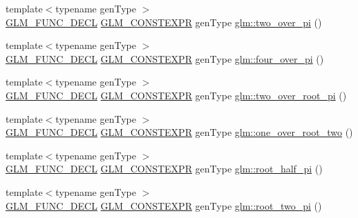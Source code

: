 \begin{DoxyCompactItemize}
\item 
{\footnotesize template$<$typename gen\+Type $>$ }\\\hyperlink{setup_8hpp_ab2d052de21a70539923e9bcbf6e83a51}{G\+L\+M\+\_\+\+F\+U\+N\+C\+\_\+\+D\+E\+CL} \hyperlink{setup_8hpp_a08b807947b47031d3a511f03f89645ad}{G\+L\+M\+\_\+\+C\+O\+N\+S\+T\+E\+X\+PR} gen\+Type \hyperlink{group__gtc__constants_ga74eadc8a211253079683219a3ea0462a}{glm\+::two\+\_\+over\+\_\+pi} ()
\item 
{\footnotesize template$<$typename gen\+Type $>$ }\\\hyperlink{setup_8hpp_ab2d052de21a70539923e9bcbf6e83a51}{G\+L\+M\+\_\+\+F\+U\+N\+C\+\_\+\+D\+E\+CL} \hyperlink{setup_8hpp_a08b807947b47031d3a511f03f89645ad}{G\+L\+M\+\_\+\+C\+O\+N\+S\+T\+E\+X\+PR} gen\+Type \hyperlink{group__gtc__constants_ga753950e5140e4ea6a88e4a18ba61dc09}{glm\+::four\+\_\+over\+\_\+pi} ()
\item 
{\footnotesize template$<$typename gen\+Type $>$ }\\\hyperlink{setup_8hpp_ab2d052de21a70539923e9bcbf6e83a51}{G\+L\+M\+\_\+\+F\+U\+N\+C\+\_\+\+D\+E\+CL} \hyperlink{setup_8hpp_a08b807947b47031d3a511f03f89645ad}{G\+L\+M\+\_\+\+C\+O\+N\+S\+T\+E\+X\+PR} gen\+Type \hyperlink{group__gtc__constants_ga5827301817640843cf02026a8d493894}{glm\+::two\+\_\+over\+\_\+root\+\_\+pi} ()
\item 
{\footnotesize template$<$typename gen\+Type $>$ }\\\hyperlink{setup_8hpp_ab2d052de21a70539923e9bcbf6e83a51}{G\+L\+M\+\_\+\+F\+U\+N\+C\+\_\+\+D\+E\+CL} \hyperlink{setup_8hpp_a08b807947b47031d3a511f03f89645ad}{G\+L\+M\+\_\+\+C\+O\+N\+S\+T\+E\+X\+PR} gen\+Type \hyperlink{group__gtc__constants_ga788fa23a0939bac4d1d0205fb4f35818}{glm\+::one\+\_\+over\+\_\+root\+\_\+two} ()
\item 
{\footnotesize template$<$typename gen\+Type $>$ }\\\hyperlink{setup_8hpp_ab2d052de21a70539923e9bcbf6e83a51}{G\+L\+M\+\_\+\+F\+U\+N\+C\+\_\+\+D\+E\+CL} \hyperlink{setup_8hpp_a08b807947b47031d3a511f03f89645ad}{G\+L\+M\+\_\+\+C\+O\+N\+S\+T\+E\+X\+PR} gen\+Type \hyperlink{group__gtc__constants_ga4e276cb823cc5e612d4f89ed99c75039}{glm\+::root\+\_\+half\+\_\+pi} ()
\item 
{\footnotesize template$<$typename gen\+Type $>$ }\\\hyperlink{setup_8hpp_ab2d052de21a70539923e9bcbf6e83a51}{G\+L\+M\+\_\+\+F\+U\+N\+C\+\_\+\+D\+E\+CL} \hyperlink{setup_8hpp_a08b807947b47031d3a511f03f89645ad}{G\+L\+M\+\_\+\+C\+O\+N\+S\+T\+E\+X\+PR} gen\+Type \hyperlink{group__gtc__constants_ga2bcedc575039fe0cd765742f8bbb0bd3}{glm\+::root\+\_\+two\+\_\+pi} ()

\end{DoxyCompactItemize}
